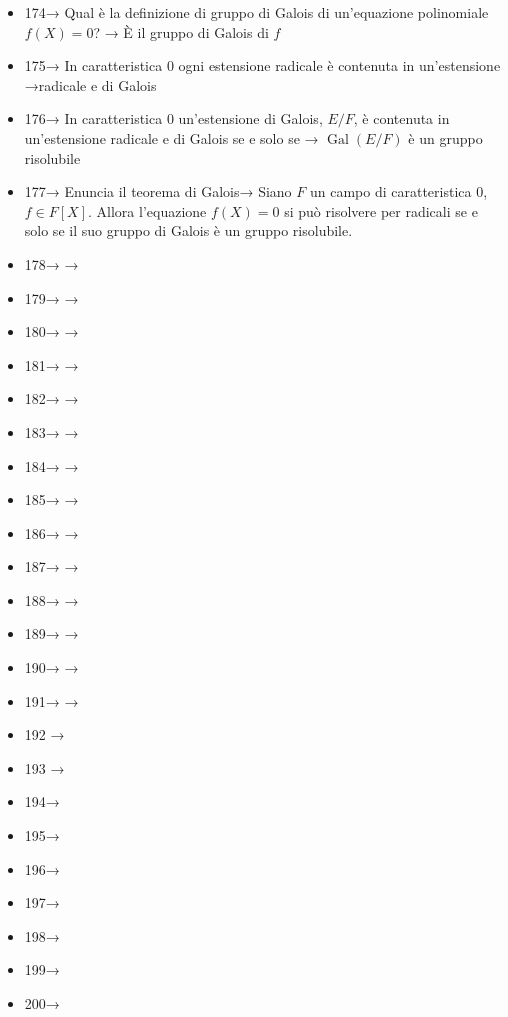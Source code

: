 \documentclass[A4,12pt]{article}
\begin{document}
\begin{itemize}[noitemsep]
		\item 174→ Qual è la definizione di gruppo di Galois di un'equazione polinomiale $ f(X) = 0 $? →	È il gruppo di Galois di $ f $
		\item 175→ In caratteristica 0 ogni  estensione radicale è contenuta in un'estensione →radicale e di Galois
		\item 176→ In caratteristica 0 un'estensione di Galois, $ E/F $, è contenuta in un'estensione radicale e di Galois se e solo se → $ \operatorname{Gal}(E/F) $ è un gruppo risolubile
		\item 177→ Enuncia il teorema di Galois→ Siano $ F $ un campo di caratteristica 0, $ f\in F[X] $. Allora l'equazione $ f(X)=0 $ si può risolvere per radicali se e solo se il suo gruppo di Galois è un gruppo risolubile.
		\item 178→ →
		\item 179→ →
		\item 180→ →
		\item 181→ →
		\item 182→ →
		\item 183→ →
		\item 184→ →
		\item 185→ →
		\item 186→ →
		\item 187→ →
		\item 188→ →
		\item 189→ →
		\item 190→ →
		\item 191→ → 
		\item 192 → 
		\item 193 → 
		\item 194→ 
		\item 195→ 
		\item 196→ 
		\item 197→
		\item 198→ 
		\item 199→ 
		\item 200→
		
	\end{itemize}
	
		
	
\end{document}
